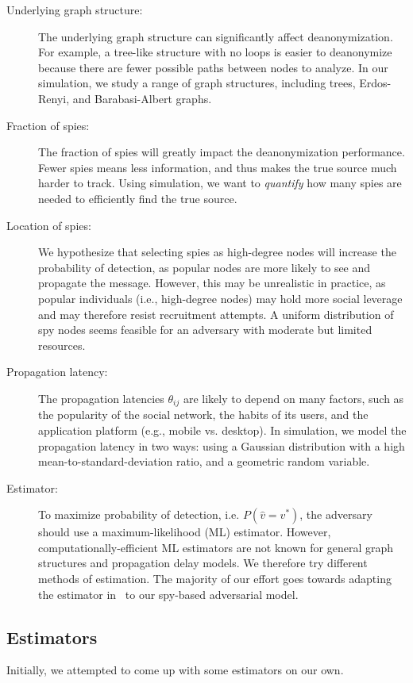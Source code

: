 \begin{description}
\vspace{-0.1in}
\item[Underlying graph structure:] The underlying graph structure can significantly affect deanonymization. For example, a tree-like structure with no loops is easier to deanonymize because there are fewer possible paths between nodes to analyze. In our simulation, we study a range of graph structures, including trees, Erdos-Renyi, and Barabasi-Albert graphs.
\item[Fraction of spies:] The fraction of spies will greatly impact the deanonymization performance. Fewer spies means less information, and thus makes the true source much harder to track. Using simulation, we want to \emph{quantify} how many spies are needed to efficiently find the true source.
\item[Location of spies:] We hypothesize that selecting spies as high-degree nodes will increase the probability of detection, as popular nodes are more likely to see and propagate the message. However, this may be unrealistic in practice, as popular individuals (i.e., high-degree nodes) may hold more social leverage and may therefore resist recruitment attempts. A uniform distribution of spy nodes seems feasible for an adversary with moderate but limited resources. 
\item[Propagation latency:] The propagation latencies $\theta_{ij}$ are likely to depend on many factors, such as the popularity of the social network, the habits of its users, and the application platform (e.g., mobile vs. desktop).
In simulation, we model the propagation latency in two ways: using a Gaussian distribution with a high mean-to-standard-deviation ratio, and a geometric random variable. 
\item[Estimator:] To maximize probability of detection, i.e. $P(\hat v=v^*)$, the adversary should use a maximum-likelihood (ML) estimator. However, computationally-efficient ML estimators are not known for general graph structures and propagation delay models. We therefore try different methods of estimation. The majority of our effort goes towards adapting the estimator in~\cite{pinto} to our spy-based adversarial model.
\end{description}

\subsection{Estimators}
Initially, we attempted to come up with some estimators on our own. 



